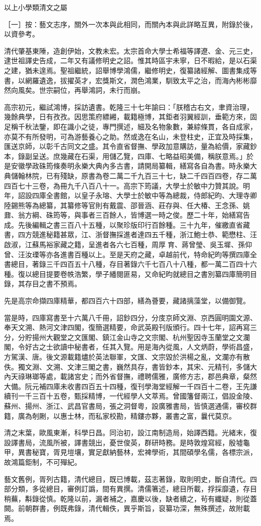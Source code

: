 \begin{pinyinscope}
以上小學類清文之屬

［一］按：藝文志序，關外一次本與此相同，而關內本與此詳略互異，附錄於後，以資參考。

清代肇基東陲，造創伊始，文教未宏。太宗首命大學士希福等譯遼、金、元三史，逮世祖譯史告成，二年又有議修明史之詔。惟其時區宇未寧，日不暇給，是以石渠之建，猶未遑焉。聖祖繼統，詔舉博學鴻儒，繼修明史，復纂諸經解、圖書集成等書，以網羅遺逸，拔擢英才，宏獎斯文，潤色鴻業，馴致太平之治，而海內彬彬靡然向風矣。世宗嗣位，再舉鴻詞，未行而崩。

高宗初元，繼試鴻博，採訪遺書。乾隆三十七年諭曰：「朕稽古右文，聿資治理，幾餘典學，日有孜孜。因思策府縹緗，載籍極博，其鉅者羽翼經訓，垂範方來，固足稱千秋法鑒，即在識小之徒，專門撰述，細及名物象數，兼綜條貫，各自成家，亦莫不有所發明，可為游藝養心之助。然或逸在名山，未登柱史，正宜及時採集，匯送京師，以彰千古同文之盛。其令直省督撫、學政加意購訪，量為給價，家藏鈔本，錄副呈送。庶幾藏在石渠，用儲乙覽，四庫、七略益昭美備，稱朕意焉。」於是安徽學政硃筠條奏明永樂大典內多古書，請開局纂輯，繕寫各自為書。時永樂大典儲翰林院，已有殘缺，原書為卷二萬二千九百三十七，缺二千四百四卷，存二萬四百七十三卷，為冊九千八百八十一。高宗下筠議，大學士於敏中力贊其說。明年，詔設四庫全書館，以皇子永瑢、大學士於敏中等為總裁，侍郎紀昀、大理寺卿陸錫熊等為總纂，其纂修等官則有戴震、邵晉涵、莊存與、任大椿、王念孫、姚鼐、翁方綱、硃筠等，與事者三百餘人，皆博選一時之俊。歷二十年，始繕寫告成。先後編輯之書三百八十五種，以聚珍版印行百餘種。三十九年，催繳直省藏書，四方競進秘籍甚眾，江、浙督撫採進者達四五千種，浙江鮑士恭、範懋柱、汪啟淑，江蘇馬裕家藏之籍，呈進者各六七百種，周厚育、蔣曾瑩、吳玉墀、孫仰曾、汪汝瑮等亦各進書百種以上。至是天府之藏，卓越前代，特命紀昀等撰四庫全書總目，著錄三千四百五十八種，存目著錄六千七百八十八種，都一萬二百四十六種。復以總目提要卷帙浩繁，學子繙閱匪易，又命紀昀就總目之書別纂四庫簡明目錄，其存目之書不預焉。

先是高宗命擷四庫精華，都四百六十四部，繕為薈要，藏諸摛藻堂，以備御覽。

當是時，四庫寫書至十六萬八千冊，詔鈔四分，分庋京師文淵、京西圓明園文源、奉天文溯、熱河文津四閣，復簡選精要，命武英殿刊版頒行。四十七年，詔再寫三分，分貯揚州大觀堂之文匯閣、鎮江金山寺之文宗閣、杭州聖因寺玉蘭堂之文瀾閣，令好古之士欲讀中秘書者，任其入覽。用是海內從風，人文炳蔚，學術昌盛，方駕漢、唐。後文源載籍燼於英法聯軍，文匯、文宗毀於洪楊之亂，文瀾亦有散佚。獨文淵、文溯、文津三閣之書，巍然具存，書皆鈔本，其宋、元精刊，多儲大內天祿琳瑯等處，載諸宮史；而外省督撫，禮聘儒雅，廣修方志，郡邑典章，粲然大備。阮元補四庫未收書四百五十四種，復刊學海堂經解一千四百十二卷，王先謙續刊一千三百十五卷，甄採精博，一代經學人文萃焉。曾國籓督兩江，倡設金陵、蘇州、揚州、浙江、武昌官書局，張之洞督粵，設廣雅書局，皆慎選通儒，審校群籍，廣為剞劂，以惠士林，而私家校勘，精鏤亦夥，叢書之富，曩代莫京。

清之末葉，歐風東漸，科學日昌。同治初，設江南制造局，始譯西籍。光緒末，復設譯書局，流風所被，譯書競出，憂世俊英，群研時務。是時敦煌寫經，殷墟龜甲，異書秘寶，胥見塏壤，實足獻納藝林，宏裨學術，其間碩學名儒，各標宗派，故鴻篇鉅制，不可殫紀。

藝文舊例，胥列古籍，清代總目，既已博載，茲志著錄，取則明史，斷自清代。四部分類，多從總目，審例訂譌，間有異撰。清儒箸述，總目所載，捊採靡遺，存目稍蕪，斠錄從慎。乾隆以前，漏者補之，嘉慶以後，缺者續之，茍有纖疑，則從蓋闕。前朝群書，例既弗錄，清代輯佚，異乎斯旨，裒纂功深，無殊撰述，故附載焉。


\end{pinyinscope}